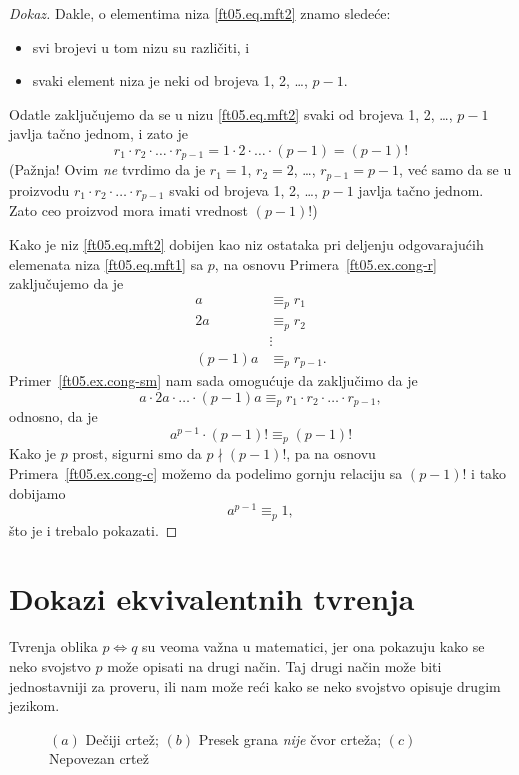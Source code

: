 \begin{proof}[Dokaz]
  Dakle, o elementima niza \eqref{ft05.eq.mft2} znamo slede\'ce:
  \begin{itemize}
  \item  svi brojevi u tom nizu su razli\v citi, i
  \item  svaki element niza je neki od brojeva 1, 2, \ldots, $p-1$.
  \end{itemize}
  Odatle zaklju\v cujemo da se u nizu \eqref{ft05.eq.mft2} svaki od brojeva
  1, 2, \ldots, $p-1$ javlja ta\v cno jednom, i zato je
  $$
    r_1 \cdot r_2 \cdot \ldots \cdot r_{p-1} = 1 \cdot 2 \cdot \ldots \cdot (p-1) = (p-1)!
  $$
  (Pa\v znja! Ovim \emph{ne} tvrdimo da je $r_1 = 1$, $r_2 = 2$, \ldots, $r_{p-1} = p-1$, ve\'c
  samo da se u proizvodu $r_1 \cdot r_2 \cdot \ldots \cdot r_{p-1}$ svaki od brojeva
  1, 2, \ldots, $p-1$ javlja ta\v cno jednom. Zato ceo proizvod mora imati vrednost $(p-1)!$)
  
  Kako je niz \eqref{ft05.eq.mft2} dobijen kao niz ostataka pri deljenju odgovaraju\'cih elemenata
  niza \eqref{ft05.eq.mft1} sa $p$, na osnovu Primera~\ref{ft05.ex.cong-r} zaklju\v cujemo da je
  \begin{align*}
    a &\equiv_p r_1 \\
    2a &\equiv_p r_2 \\
       &\vdots\\
    (p-1)a &\equiv_p r_{p-1}.
  \end{align*}
  Primer~\ref{ft05.ex.cong-sm} nam sada omogu\'cuje da zaklju\v cimo da je
  $$
    a \cdot 2a \cdot \ldots \cdot (p-1) a \equiv_p r_1 \cdot r_2 \cdot \ldots \cdot r_{p-1},
  $$
  odnosno, da je
  $$
    a^{p-1} \cdot (p-1)! \equiv_p (p-1)!
  $$
  Kako je $p$ prost, sigurni smo da $p \nmid (p-1)!$, pa na osnovu Primera~\ref{ft05.ex.cong-c}
  mo\v zemo da podelimo gornju relaciju sa $(p-1)!$ i tako dobijamo
  $$
    a^{p-1} \equiv_p 1,
  $$
  \v sto je i trebalo pokazati.
\end{proof}

\section{Dokazi ekvivalentnih tvr\dj enja}

Tvr\dj enja oblika
$
  p \Leftrightarrow q
$
su veoma va\v zna u matematici, jer ona pokazuju kako se neko svojstvo $p$ mo\v ze opisati na drugi
na\v cin. Taj drugi na\v cin mo\v ze biti jednostavniji za proveru, ili nam mo\v ze re\'ci kako se neko
svojstvo opisuje drugim jezikom.

\begin{figure}
  \centering
  
  \caption{$(a)$ De\v ciji crte\v z; $(b)$ Presek grana \emph{nije} \v cvor crte\v za; $(c)$ Nepovezan crte\v z}
  \label{ft01.fig.1potez1}
\end{figure}

